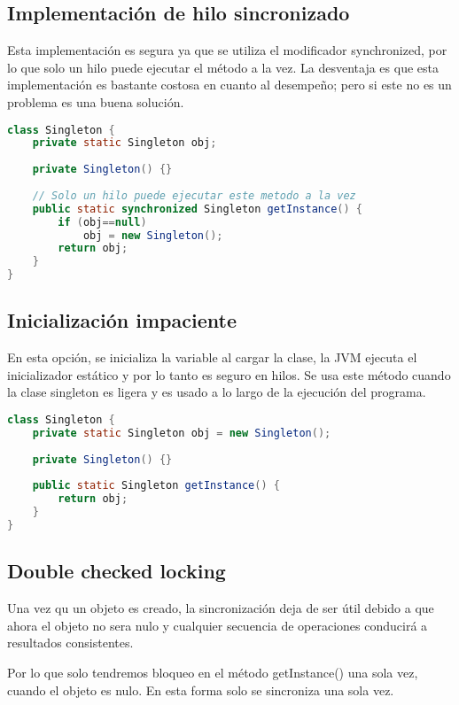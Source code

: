 \documentclass[a4paper,12pt]{article}
\begin{document}
\subsection{Implementación de hilo sincronizado}
Esta implementación es segura ya que se utiliza el modificador synchronized, 
por lo que solo un hilo puede ejecutar el método a la vez. La desventaja es que 
esta implementación es bastante costosa en cuanto al desempeño; pero si este no 
es un problema es una buena solución.

\begin{lstlisting}[language=Java,style=customJava,basicstyle=\fontfamily{cmss}
\small]
class Singleton { 
    private static Singleton obj; 
  
    private Singleton() {} 
  
    // Solo un hilo puede ejecutar este metodo a la vez
    public static synchronized Singleton getInstance() { 
        if (obj==null) 
            obj = new Singleton(); 
        return obj; 
    } 
}
\end{lstlisting}

\subsection{Inicialización impaciente}
En esta opción, se inicializa la variable al cargar la clase, la JVM ejecuta el 
inicializador estático y por lo tanto es seguro en hilos. Se usa este método 
cuando la clase singleton es ligera y es usado a lo largo de la ejecución del 
programa.

\begin{lstlisting}[language=Java,style=customJava,basicstyle=\fontfamily{cmss}
\small]
class Singleton { 
    private static Singleton obj = new Singleton(); 
  
    private Singleton() {} 
  
    public static Singleton getInstance() { 
        return obj; 
    } 
} 

\end{lstlisting}

\subsection{Double checked locking}
Una vez qu un objeto es creado, la sincronización deja de ser útil debido a que 
ahora el objeto no sera nulo y cualquier secuencia de operaciones conducirá a 
resultados consistentes.

Por lo que solo tendremos bloqueo en el método getInstance() una sola vez, 
cuando el objeto es nulo. En esta forma solo se sincroniza una sola vez.
\end{document}
